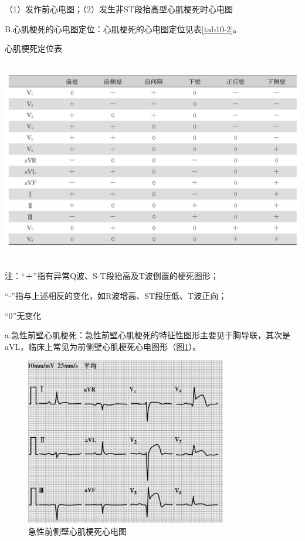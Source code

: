 （1）发作前心电图；（2）发生非ST段抬高型心肌梗死时心电图

B.心肌梗死的心电图定位：心肌梗死的心电图定位见表\ref{tab10-2}。

\begin{table}[htbp]
\centering
\caption{心肌梗死定位表}
\label{tab10-2}
\includegraphics[width=5.96875in,height=3.5in]{./images/Image00072.jpg}
\end{table}

注：“＋”指有异常Q波、S-T段抬高及T波倒置的梗死图形；

“-”指与上述相反的变化，如R波增高、ST段压低、T波正向；

“0”无变化

a.急性前壁心肌梗死：急性前壁心肌梗死的特征性图形主要见于胸导联，其次是aVL，临床上常见为前侧壁心肌梗死心电图形（图\ref{fig10-2}）。

\begin{figure}[!htbp]
 \centering
 \includegraphics[width=3.45833in,height=2.88542in]{./images/Image00073.jpg}
 \captionsetup{justification=centering}
 \caption{急性前侧壁心肌梗死心电图}
 \label{fig10-2}
  \end{figure} 


